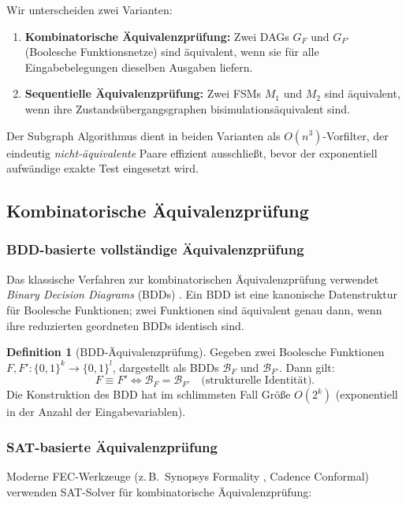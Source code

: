 ﻿\documentclass[a4paper,12pt]{article}
\theoremstyle{definition}
\newtheorem{definition}{Definition}
\begin{document}
Wir unterscheiden zwei Varianten:
\begin{enumerate}
  \item \textbf{Kombinatorische Äquivalenzprüfung:} Zwei DAGs $G_F$ und $G_{F'}$
        (Boolesche Funktionsnetze) sind äquivalent, wenn sie für alle
        Eingabebelegungen dieselben Ausgaben liefern.
  \item \textbf{Sequentielle Äquivalenzprüfung:} Zwei FSMs $M_1$ und $M_2$ sind
        äquivalent, wenn ihre Zustandsübergangsgraphen bisimulationsäquivalent sind.
\end{enumerate}

Der Subgraph Algorithmus dient in beiden Varianten als $O(n^3)$-Vorfilter, der
eindeutig \emph{nicht-äquivalente} Paare effizient ausschließt, bevor der exponentiell
aufwändige exakte Test eingesetzt wird.

\subsection{Kombinatorische Äquivalenzprüfung}

\subsubsection{BDD-basierte vollständige Äquivalenzprüfung}

Das klassische Verfahren zur kombinatorischen Äquivalenzprüfung verwendet
\emph{Binary Decision Diagrams} (BDDs) \cite{mcmillan1993symbolic}. Ein BDD ist eine
kanonische Datenstruktur für Boolesche Funktionen; zwei Funktionen sind äquivalent
genau dann, wenn ihre reduzierten geordneten BDDs identisch sind.

\begin{definition}[BDD-Äquivalenzprüfung]\label{def:bddequiv}
  Gegeben zwei Boolesche Funktionen $F, F': \{0,1\}^k \to \{0,1\}^l$, dargestellt als
  BDDs $\mathcal{B}_F$ und $\mathcal{B}_{F'}$. Dann gilt:
  \[
    F \equiv F' \iff \mathcal{B}_F = \mathcal{B}_{F'} \quad \text{(strukturelle Identität).}
  \]
  Die Konstruktion des BDD hat im schlimmsten Fall Größe $O(2^k)$ (exponentiell in der
  Anzahl der Eingabevariablen).
\end{definition}

\subsubsection{SAT-basierte Äquivalenzprüfung}

Moderne FEC-Werkzeuge (z.\,B.\ Synopsys Formality \cite{synopsys_dc}, Cadence Conformal)
verwenden SAT-Solver für kombinatorische Äquivalenzprüfung:
\end{document}
